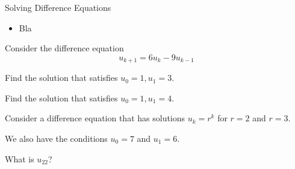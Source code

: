 %
%
%
%
%
%
%
%











%
%



\begin{module}{Solving Difference Equations}
	\label{diff:solve}

	
	
\end{module}



\begin{lesson}

	\begin{itemize}
		\item Bla
	\end{itemize}
	

\end{lesson}





\question	
	Consider the difference equation
	$$	u_{k+1} = 6 u_k - 9u_{k-1}	$$
	
\begin{parts}
	\item Find the solution that satisfies $u_0 = 1, u_1 = 3	$.
	\item Find the solution that satisfies $u_0 = 1, u_1 = 4$.
\end{parts}



\bookonlynewpage


\question
	Consider a difference equation that has solutions $u_k = r^k$ for $r=2$ and $r=3$.
	
	We also have the conditions $u_0 = 7$ and $u_1=6$.
	
	What is $u_{22}$?



